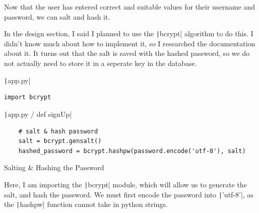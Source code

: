 \documentclass[12pt]{report}
\newcommand{\pil}[1]{\protect\texttt|#1|}
\begin{document}
\begin{center}
\end{center}

Now that the user has entered correct and suitable values for their username and password, we can salt and hash it.

In the design section, I said I planned to use the \pil{bcrypt} algorithm to do this. I didn't know much about how to implement it, so I researched the documentation about it. It turns out that the salt is saved with the hashed password, so we do not actually need to store it in a seperate key in the database. 

\begin{listing}[H]
\pil{app.py}
\begin{verbatim}
import bcrypt
\end{verbatim}
\pil{app.py / def signUp}
\begin{verbatim}
    # salt & hash password
    salt = bcrypt.gensalt()
    hashed_password = bcrypt.hashpw(password.encode('utf-8'), salt)
\end{verbatim}
\caption{Salting \& Hashing the Password}\label{cs:saltHashPassword}
\end{listing}

Here, I am importing the \pil{bcrypt} module, which will allow us to generate the salt, and hash the password. We must first encode the password into \pil{'utf-8'}, as the \pil{hashpw} function cannot take in python strings.
\end{document}
